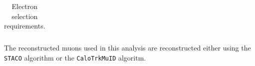 \begin{table}[]
\begin{tabular}{ l  l l }
%
    \hline \hline
  \end{tabular}
   \caption{Electron selection requirements.}
   \label{table:objsel-el}
\end{table}

The reconstructed muons used in this analysis are reconstructed either using the
\verb|STACO| algorithm or the \verb|CaloTrkMuID| algoritm. 

